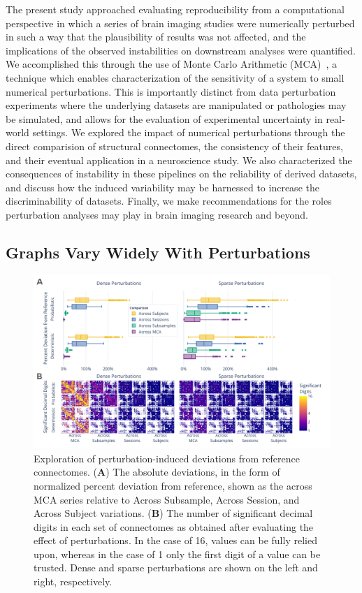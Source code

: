 \documentclass[fleqn,10pt]{SelfArx} %
\newcommand{\new}[1]{{\color{blue} #1}}
\begin{document}
The present study approached evaluating reproducibility from a computational perspective in which a series of brain
imaging studies were numerically perturbed \new{in} such \new{a way} that the plausibility of results was not affected, and the
implications of the observed instabilities \new{on downstream analyses} were quantified. We accomplished this through the use of Monte Carlo
Arithmetic (MCA)~\cite{Parker1997-qq}, a technique which enables characterization of the sensitivity of a system to
small \new{numerical} perturbations. \new{This is importantly distinct from data perturbation experiments where the underlying
datasets are manipulated or pathologies may be simulated, and allows for the evaluation of experimental uncertainty in real-world
settings.} We explored the impact of \new{numerical} perturbations through the direct comparision of structural connectomes,
the consistency of their features, and their eventual application in a neuroscience study. \new{We also characterized the}
consequences \new{of instability in these pipelines on the reliability of derived datasets,} and \new{discuss how the induced
variability may be harnessed to increase the discriminability of datasets}. \new{Finally, we} make recommendations for
the roles \new{perturbation} analyses may play in brain imaging research \new{and beyond}.

\subsection*{Graphs Vary Widely With Perturbations}
\begin{figure}[hbt]\centering
\includegraphics[width=0.98\linewidth]{figures/fig1_absolute_differences.pdf}
\caption{Exploration of perturbation-induced deviations from reference connectomes.
(\textbf{A}) The absolute deviations, in the form of normalized percent deviation from reference, shown as the
across MCA series relative to Across Subsample, Across Session, and Across Subject variations.
(\textbf{B}) The number of significant decimal digits in each set of connectomes as obtained after evaluating the
effect of perturbations. In the case of 16, values can be fully relied upon, whereas in the case of 1 only the first
digit of a value can be trusted. \new{Dense} and \new{sparse} perturbations are shown on the left and right, respectively.}
\label{fig:absolute}
\end{figure}
\end{document}
